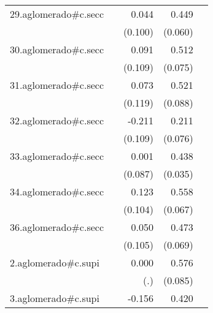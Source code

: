 {\begin{longtable}{l*{4}{D{.}{.}{-1}}}
\addlinespace
29.aglomerado#c.secc&                     &       0.044         &       0.449\sym{***}&                     \\
            &                     &     (0.100)         &     (0.060)         &                     \\
\addlinespace
30.aglomerado#c.secc&                     &       0.091         &       0.512\sym{***}&                     \\
            &                     &     (0.109)         &     (0.075)         &                     \\
\addlinespace
31.aglomerado#c.secc&                     &       0.073         &       0.521\sym{***}&                     \\
            &                     &     (0.119)         &     (0.088)         &                     \\
\addlinespace
32.aglomerado#c.secc&                     &      -0.211         &       0.211\sym{**} &                     \\
            &                     &     (0.109)         &     (0.076)         &                     \\
\addlinespace
33.aglomerado#c.secc&                     &       0.001         &       0.438\sym{***}&                     \\
            &                     &     (0.087)         &     (0.035)         &                     \\
\addlinespace
34.aglomerado#c.secc&                     &       0.123         &       0.558\sym{***}&                     \\
            &                     &     (0.104)         &     (0.067)         &                     \\
\addlinespace
36.aglomerado#c.secc&                     &       0.050         &       0.473\sym{***}&                     \\
            &                     &     (0.105)         &     (0.069)         &                     \\
\addlinespace
2.aglomerado#c.supi&                     &       0.000         &       0.576\sym{***}&                     \\
            &                     &         (.)         &     (0.085)         &                     \\
\addlinespace
3.aglomerado#c.supi&                     &      -0.156         &       0.420\sym{***}&                     \\

\end{longtable}}
